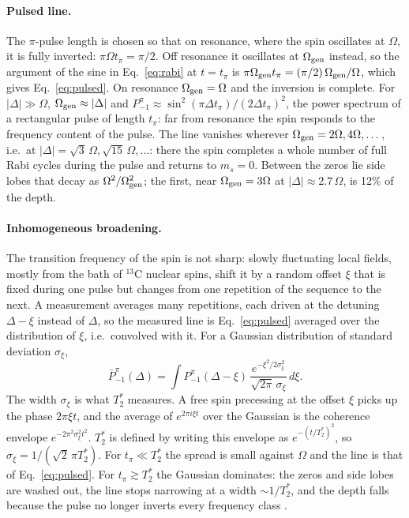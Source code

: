\paragraph{Pulsed line.} The $\pi$-pulse length is chosen so that on resonance, where the spin oscillates at
$\Omega$, it is fully inverted: $\pi\Omega t_\pi=\pi/2$. Off resonance it oscillates at $\Omega_{\rm gen}$ instead, so
the argument of the sine in Eq.~\eqref{eq:rabi} at $t=t_\pi$ is $\pi\Omega_{\rm gen} t_\pi=(\pi/2)\,\Omega_{\rm gen}/\Omega$,
which gives Eq.~\eqref{eq:pulsed}. On resonance $\Omega_{\rm gen}=\Omega$ and the inversion is complete. For
$|\Delta|\gg\Omega$, $\Omega_{\rm gen}\approx|\Delta|$ and
$P_{-1}^{\pi}\approx\sin^2(\pi\Delta t_\pi)/(2\Delta t_\pi)^2$, the power spectrum of a rectangular pulse of length
$t_\pi$: far from resonance the spin responds to the frequency content of the pulse. The line vanishes wherever
$\Omega_{\rm gen}=2\Omega,4\Omega,\dots$, i.e.\ at $|\Delta|=\sqrt3\,\Omega,\sqrt{15}\,\Omega,\dots$: there the spin
completes a whole number of full Rabi cycles during the pulse and returns to $m_s=0$. Between the zeros lie side
lobes that decay as $\Omega^2/\Omega_{\rm gen}^2$; the first, near $\Omega_{\rm gen}=3\Omega$ at $|\Delta|\approx2.7\,\Omega$,
is 12\% of the depth.

\paragraph{Inhomogeneous broadening.} The transition frequency of the spin is not sharp: slowly fluctuating local
fields, mostly from the bath of $^{13}$C nuclear spins, shift it by a random offset $\xi$ that is fixed during one
pulse but changes from one repetition of the sequence to the next. A measurement averages many repetitions, each
driven at the detuning $\Delta-\xi$ instead of $\Delta$, so the measured line is Eq.~\eqref{eq:pulsed} averaged over
the distribution of $\xi$, i.e.\ convolved with it. For a Gaussian distribution of standard deviation $\sigma_\xi$,
\begin{equation}
  \bar P_{-1}^{\pi}(\Delta)=\int P_{-1}^{\pi}(\Delta-\xi)\,\frac{e^{-\xi^2/2\sigma_\xi^2}}{\sqrt{2\pi}\,\sigma_\xi}\,d\xi .
  \label{eq:pulsed-t2star}
\end{equation}
The width $\sigma_\xi$ is what $T_2^*$ measures. A free spin precessing at the offset $\xi$ picks up the phase
$2\pi\xi t$, and the average of $e^{2\pi i\xi t}$ over the Gaussian is the coherence envelope
$e^{-2\pi^2\sigma_\xi^2t^2}$. $T_2^*$ is defined by writing this envelope as $e^{-(t/T_2^*)^2}$, so
$\sigma_\xi=1/(\sqrt2\,\pi T_2^*)$. For $t_\pi\ll T_2^*$ the spread is small against $\Omega$ and the line is that of
Eq.~\eqref{eq:pulsed}. For $t_\pi\gtrsim T_2^*$ the Gaussian dominates: the zeros and side lobes are washed out, the
line stops narrowing at a width $\sim1/T_2^*$, and the depth falls because the pulse no longer inverts every
frequency class \cite{dreau2011}.

